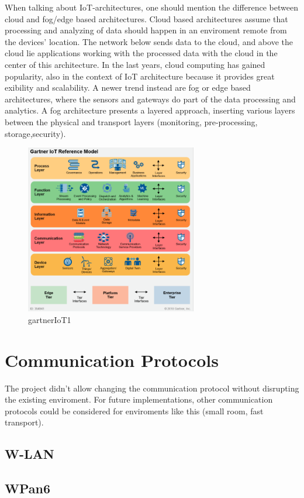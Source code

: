 When talking about IoT-architectures, one should mention the difference between cloud and fog/edge based architectures. 
Cloud based architectures assume that processing and analyzing of data should happen in an enviroment remote from the devices' location.
The network below sends data to the cloud, and above the cloud lie applications working with the processed data with the cloud in the center of this architecture.
In the last years, cloud computing has gained popularity, also in the context of IoT architecture \parencite{cloudArchIoT} because it provides great exibility and scalability.
A newer trend instead are fog or edge based architectures, where the sensors and gateways do part of the data processing and analytics.
A fog architecture presents a layered approach, inserting various layers between the physical and transport layers (monitoring, pre-processing, storage,security).


\begin{figure}[th]
	\centering
	\includegraphics[width=75mm,scale=0.75]{Figures/gartnerIoT}
	\decoRule
	\caption[Gartner]{gartnerIoT1}
	\label{fig:gartnerIoT}
\end{figure}

\section{Communication Protocols}
The project didn't allow changing the communication protocol without disrupting the existing enviroment. 
For future implementations, other communication protocols could be considered for enviroments like this (small room, fast transport).
\subsection{W-LAN}
\subsection{WPan6}

